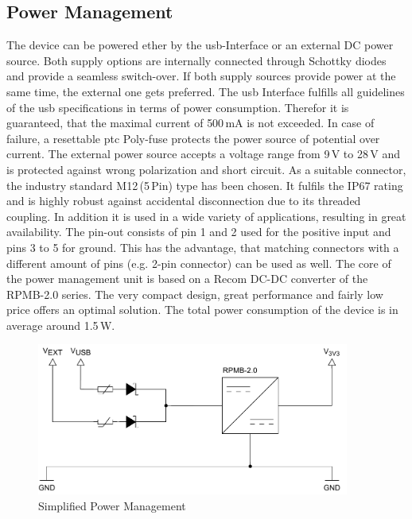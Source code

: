 \subsection{Power Management}
The device can be powered ether by the \acrshort{usb}-Interface or an external DC power source. Both supply options are internally connected through Schottky diodes and provide a seamless switch-over. If both supply sources provide power at the same time, the external one gets preferred.\newline
The \acrfull{usb} Interface fulfills all guidelines of the \acrshort{usb} specifications in terms of power consumption. Therefor it is guaranteed, that the maximal current of 500\,mA is not exceeded. In case of failure, a resettable \acrshort{ptc} Poly-fuse protects the power source of potential over current.\newline
The external power source accepts a voltage range from 9\,V to 28\,V and is protected against wrong polarization and short circuit. As a suitable connector, the industry standard M12\,(5\,Pin) type has been chosen. It fulfils the IP67 rating and is highly robust against accidental disconnection due to its threaded coupling. In addition it is used in a wide variety of applications, resulting in great availability. The pin-out consists of pin 1 and 2 used for the positive input and pins 3 to 5 for ground. This has the advantage, that matching connectors with a different amount of pins (e.g. 2-pin connector) can be used as well.\newline
The core of the power management unit is based on a Recom DC-DC converter of the RPMB-2.0 series. The very compact design, great performance and fairly low price offers an optimal solution.\newline
The total power consumption of the device is in average around 1.5\,W.

\bigskip
\begin{figure}[h!]
	\centering
	\includegraphics[height=5cm]{images/power}
	\caption{Simplified Power Management}
	\label{fig:simplified-power}
\end{figure}
\newpage

